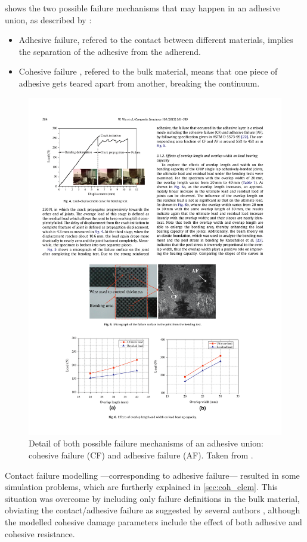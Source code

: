 \documentclass[
documentsize = a4, %
font = cmr, %
typesize = 11, %
printmode = true,
onehalfspacing = true,
language = en, %
titlepage = udciccp, %
degree = pt, %
dedication = true,
acknowledgements = true,
abstract-en = true,
abstract-es = false,
abstract-ga = false,
epigraphs = true,
toc = true,
lof = true,
lot = true,
frontmatterintoc = false,
notation = false,
minimal = false,
]{UDCthesis}
\begin{document}
 shows the two possible failure mechanisms that may happen in an adhesive union, as described by \citet{Wu2013}:
\begin{itemize}
	\item Adhesive failure, refered to the contact between different materials, implies the separation of the adhesive from the adherend.

	\item Cohesive failure \citep{Vaidya2006}, refered to the bulk material, means that one piece of adhesive gets teared apart from another, breaking the continuum.
\end{itemize}

\begin{figure}
	\centering
	\includegraphics[width=0.7\linewidth]{IMG_CUTRES/Wu_failure_systems}
	\caption[Detail of both possible failure mechanisms of an adhesive union: cohesive failure and adhesive failure.]{Detail of both possible failure mechanisms of an adhesive union: cohesive failure (CF) and adhesive failure (AF). Taken from \citet{Wu2013}.}
	\label{fig:Wu_failure_systems}
\end{figure}

Contact failure modelling ---corresponding to adhesive failure--- resulted in some simulation problems, which are furtherly explained in \cref{sec:coh_elem}. This situation was overcome by including only failure definitions in the bulk material, obviating the contact/adhesive failure as suggested by several authors \citep{Greve2007, Loureiro2010, Sadowski2010, Sadowski2011, Scattina2011, Sadowski2014, SernaMoreno2015}, although the modelled cohesive damage parameters include the effect of both adhesive and cohesive resistance.
\end{document}
